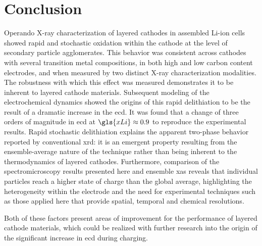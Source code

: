 \documentclass{article}
\begin{document}
\section{Conclusion}

Operando X-ray characterization of layered cathodes in assembled
Li-ion cells showed rapid and stochastic oxidation within the cathode
at the level of secondary particle agglomerates. This behavior was
consistent across cathodes with several transition metal compositions,
in both high and low carbon content electrodes, and when measured by
two distinct X-ray characterization modalities. The robustness with
which this effect was measured demonstrates it to be inherent to
layered cathode materials. Subsequent modeling of the electrochemical
dynamics showed the origins of this rapid delithiation to be the
result of a dramatic increase in the \gls{ecd}. It was found that a
change of three orders of magnitude in \gls{ecd} at $\gls{xLi}\approx
0.9$ to reproduce the experimental results. Rapid stochastic
delithiation explains the apparent two-phase behavior reported by
conventional \gls{xrd}: it is an emergent property resulting from the
ensemble-average nature of the technique rather than being inherent to
the thermodynamics of layered cathodes. Furthermore, comparison of the
spectromicroscopy results presented here and ensemble \gls{xas}
reveals that individual particles reach a higher state of charge than
the global average, highlighting the heterogeneity within the
electrode and the need for experimental techniques such as those
applied here that provide spatial, temporal and chemical resolutions.

   Both
of these factors present areas of improvement for the performance of
layered cathode materials, which could be realized with further
research into the origin of the significant increase in \gls{ecd}
during charging.
\end{document}
